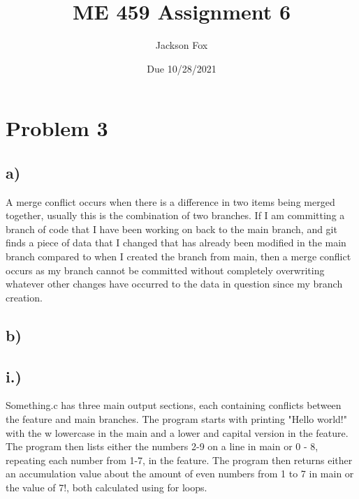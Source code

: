 \documentclass[11pt, oneside]{article}   	%
\title{ME 459 Assignment 6}
\author{Jackson Fox}
\date{Due 10/28/2021}							%
\begin{document}
\maketitle
\section*{Problem 3}
\subsection*{a)}
A merge conflict occurs when there is a difference in two items being merged together, usually this is the combination of two branches.  If I am committing a branch of code that I have been working on back to the main branch, and git finds a piece of data that I changed that has already been modified in the main branch compared to when I created the branch from main, then a merge conflict occurs as my branch cannot be committed without completely overwriting whatever other changes have occurred to the data in question since my branch creation.
\subsection*{b)}
	\subsection*{i.)} Something.c has three main output sections, each containing conflicts between the feature and main branches. The program starts with printing "Hello world!" with the w lowercase in the main and a lower and capital version in the feature.  The program then lists either the numbers 2-9 on a line in main or 0 - 8, repeating each number from 1-7, in the feature.  The program then returns either an accumulation value about the amount of even numbers from 1 to 7 in main or the value of 7!, both calculated using for loops.
\end{document}
